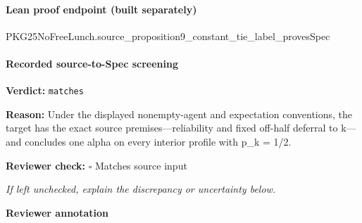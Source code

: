 \documentclass[10pt]{article}
\newcommand{\reviewerbox}{%
  \par\noindent\fbox{\parbox{0.96\linewidth}{\rule{0pt}{0.38in}}}\par
}
\newcommand{\reviewmatch}[1]{%
  \par\noindent\textbf{Reviewer check:} $\square$\; #1\par
  \noindent\emph{If left unchecked, explain the discrepancy or uncertainty below.}\par
}
\begin{document}
\paragraph{Lean proof endpoint (built separately)}\begin{ReviewVerbatim}
PKG25NoFreeLunch.source_proposition9_constant_tie_label_provesSpec
\end{ReviewVerbatim}

\paragraph{Recorded source-to-Spec screening}
\textbf{Verdict:} \texttt{matches}
\\
{\raggedright
\textbf{Reason:} Under the displayed nonempty-\allowbreak{}agent and expectation conventions, the target has the exact source premises—reliability and fixed off-\allowbreak{}half deferral to k—and concludes one alpha on every interior profile with p\_\allowbreak{}k = 1/\allowbreak{}2.\allowbreak{}
\par}
\reviewmatch{Matches source input}
\noindent\textbf{Reviewer annotation}\par
\reviewerbox
\end{document}
